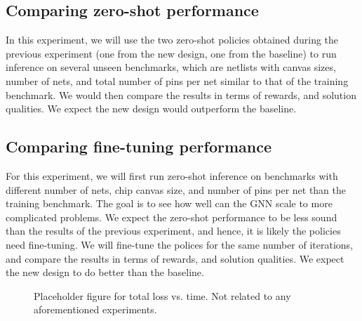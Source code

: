 \documentclass[letterpaper]{article}
\begin{document}
\subsection{Comparing zero-shot performance} \label{m:0}
In this experiment, we will use the two zero-shot policies obtained during the previous experiment (one from the new design, one from the baseline) to run inference on several unseen benchmarks, which are netlists with canvas sizes, number of nets, and total number of pins per net similar to that of the training benchmark. We would then compare the results in terms of rewards, and solution qualities. We expect the new design would outperform the baseline.

\subsection{Comparing fine-tuning performance}
For this experiment, we will first run zero-shot inference on benchmarks with different number of nets, chip canvas size, and number of pins per net than the training benchmark. The goal is to see how well can the GNN scale to more complicated problems. We expect the zero-shot performance to be less sound than the results of the previous experiment, and hence, it is likely the policies need fine-tuning. We will fine-tune the polices for the same number of iterations, and compare the results in terms of rewards, and solution qualities. We expect the new design to do better than the baseline.

\begin{figure}[h!]
    \centering
    \caption{Placeholder figure for total loss vs. time. Not related to any aforementioned experiments.}
\end{figure}
\end{document}
